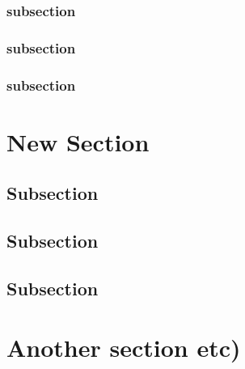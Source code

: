 \documentclass[12pt]{article}
\begin{document}
\subsubsection{subsection}


\subsubsection{subsection}


\subsubsection{subsection}



\newpage
\section{New Section}

\subsection{Subsection}


\subsection{Subsection}


\subsection{Subsection}





\newpage
\section{Another section etc)}

\par


\newpage
\end{document}
